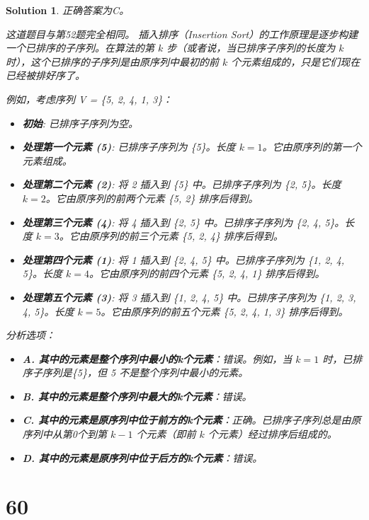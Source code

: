 \documentclass[UTF8]{report}
\newtheorem{solution}{Solution}
\theoremstyle{MyLineTheoremStyle} %
\theoremstyle{MyBlockTheoremStyle} %
\theoremstyle{MySubsubsectionStyle} %
\begin{document}
\begin{solution}
正确答案为C。

这道题目与第52题完全相同。
插入排序（Insertion Sort）的工作原理是逐步构建一个已排序的子序列。在算法的第 $k$ 步（或者说，当已排序子序列的长度为 $k$ 时），这个已排序的子序列是由原序列中最初的前 $k$ 个元素组成的，只是它们现在已经被排好序了。

例如，考虑序列 V = \{5, 2, 4, 1, 3\}：
\begin{itemize}
    \item \textbf{初始}: 已排序子序列为空。
    \item \textbf{处理第一个元素 (5)}: 已排序子序列为 \{5\}。长度 $k=1$。它由原序列的第一个元素组成。
    \item \textbf{处理第二个元素 (2)}: 将 2 插入到 \{5\} 中。已排序子序列为 \{2, 5\}。长度 $k=2$。它由原序列的前两个元素 \{5, 2\} 排序后得到。
    \item \textbf{处理第三个元素 (4)}: 将 4 插入到 \{2, 5\} 中。已排序子序列为 \{2, 4, 5\}。长度 $k=3$。它由原序列的前三个元素 \{5, 2, 4\} 排序后得到。
    \item \textbf{处理第四个元素 (1)}: 将 1 插入到 \{2, 4, 5\} 中。已排序子序列为 \{1, 2, 4, 5\}。长度 $k=4$。它由原序列的前四个元素 \{5, 2, 4, 1\} 排序后得到。
    \item \textbf{处理第五个元素 (3)}: 将 3 插入到 \{1, 2, 4, 5\} 中。已排序子序列为 \{1, 2, 3, 4, 5\}。长度 $k=5$。它由原序列的前五个元素 \{5, 2, 4, 1, 3\} 排序后得到。
\end{itemize}

分析选项：
\begin{itemize}
    \item \textbf{A. 其中的元素是整个序列中最小的k个元素}：错误。例如，当 $k=1$ 时，已排序子序列是\{5\}，但 5 不是整个序列中最小的元素。
    \item \textbf{B. 其中的元素是整个序列中最大的k个元素}：错误。
    \item \textbf{C. 其中的元素是原序列中位于前方的k个元素}：正确。已排序子序列总是由原序列中从第0个到第 $k-1$ 个元素（即前 $k$ 个元素）经过排序后组成的。
    \item \textbf{D. 其中的元素是原序列中位于后方的k个元素}：错误。
\end{itemize}
\end{solution}


\section*{60}
\end{document}
